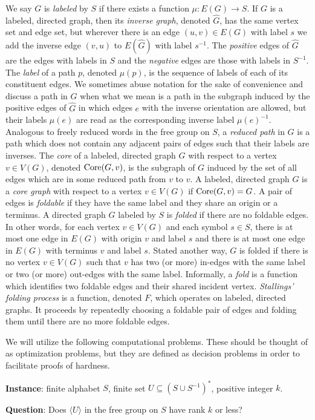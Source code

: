 \documentclass{article}
\newcommand{\FGR}{\textsc{Free Group Rank}}
\newcommand{\gen}[1]{\langle #1 \rangle}
\newcommand{\Core}{\textnormal{Core}}
\newcommand{\Instance}{\textbf{Instance}: }
\newcommand{\Question}{\textbf{Question}: }
\newcommand{\instanceindent}{%
  \setlength{\leftskip}{\widthof{\Instance}}%
  \setlength{\parindent}{0pt - \widthof{\Instance}}}
\newcommand{\questionindent}{%
  \setlength{\leftskip}{\widthof{\Question}}%
  \setlength{\parindent}{0pt - \widthof{\Question}}}
\begin{document}
We say $G$ is \emph{labeled} by $S$ if there exists a function $\mu \colon E(G) \to S$.
If $G$ is a labeled, directed graph, then its \emph{inverse graph}, denoted $\hat{G}$, has the same vertex set and edge set, but wherever there is an edge $(u, v) \in E(G)$ with label $s$ we add the inverse edge $(v, u)$ to $E(\hat{G})$ with label $s^{-1}$.
The \emph{positive} edges of $\hat{G}$ are the edges with labels in $S$ and the \emph{negative} edges are those with labels in $S^{-1}$.
The \emph{label} of a path $p$, denoted $\mu(p)$, is the sequence of labels of each of its constituent edges.
We sometimes abuse notation for the sake of convenience and discuss a path in $G$ when what we mean is a path in the subgraph induced by the positive edges of $\hat{G}$ in which edges $e$ with the inverse orientation are allowed, but their labels $\mu(e)$ are read as the corresponding inverse label $\mu(e)^{-1}$.
Analogous to freely reduced words in the free group on $S$, a \emph{reduced path} in $G$ is a path which does not contain any adjacent pairs of edges such that their labels are inverses.
The \emph{core} of a labeled, directed graph $G$ with respect to a vertex $v \in V(G)$, denoted $\Core(G, v)$, is the subgraph of $G$ induced by the set of all edges which are in some reduced path from $v$ to $v$.
A labeled, directed graph $G$ is a \emph{core graph} with respect to a vertex $v \in V(G)$ if $\Core(G, v) = G$.
A pair of edges is \emph{foldable} if they have the same label and they share an origin or a terminus.
A directed graph $G$ labeled by $S$ is \emph{folded} if there are no foldable edges.
In other words, for each vertex $v \in V(G)$ and each symbol $s \in S$, there is at most one edge in $E(G)$ with origin $v$ and label $s$ and there is at most one edge in $E(G)$ with terminus $v$ and label $s$.
Stated another way, $G$ is folded if there is no vertex $v \in V(G)$ such that $v$ has two (or more) in-edges with the same label or two (or more) out-edges with the same label.
Informally, a \emph{fold} is a function which identifies two foldable edges and their shared incident vertex.
\emph{Stallings' folding process} is a function, denoted $F$, which operates on labeled, directed graphs.
It proceeds by repeatedly choosing a foldable pair of edges and folding them until there are no more foldable edges.

We will utilize the following computational problems.
These should be thought of as optimization problems, but they are defined as decision problems in order to facilitate proofs of hardness.
\begin{definition}[\FGR]
  \mbox{}

  \instanceindent
  \Instance finite alphabet $S$, finite set $U \subseteq (S \cup S^{-1})^*$, positive integer $k$.

  \questionindent
  \Question Does $\gen{U}$ in the free group on $S$ have rank $k$ or less?
\end{definition}
\end{document}
